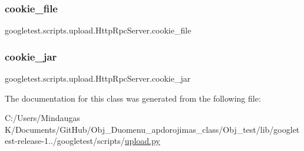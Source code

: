 \mbox{\label{classgoogletest_1_1scripts_1_1upload_1_1_http_rpc_server_a93d79871cecd4e0e28c55434ca0a2ec3}} 
\subsubsection{\texorpdfstring{cookie\_file}{cookie\_file}}
{\footnotesize\ttfamily googletest.\+scripts.\+upload.\+Http\+Rpc\+Server.\+cookie\+\_\+file}

\mbox{\label{classgoogletest_1_1scripts_1_1upload_1_1_http_rpc_server_a85d00bef22c50acb5dd6dbb985556b1b}} 
\subsubsection{\texorpdfstring{cookie\_jar}{cookie\_jar}}
{\footnotesize\ttfamily googletest.\+scripts.\+upload.\+Http\+Rpc\+Server.\+cookie\+\_\+jar}



The documentation for this class was generated from the following file\+:\begin{DoxyCompactItemize}
\item 
C\+:/\+Users/\+Mindaugas K/\+Documents/\+Git\+Hub/\+Obj\+\_\+\+Duomenu\+\_\+apdorojimas\+\_\+class/\+Obj\+\_\+test/lib/googletest-\/release-\/1../googletest/scripts/\mbox{\hyperlink{_obj__test_2lib_2googletest-release-1_88_81_2googletest_2scripts_2upload_8py}{upload.\+py}}\end{DoxyCompactItemize}
